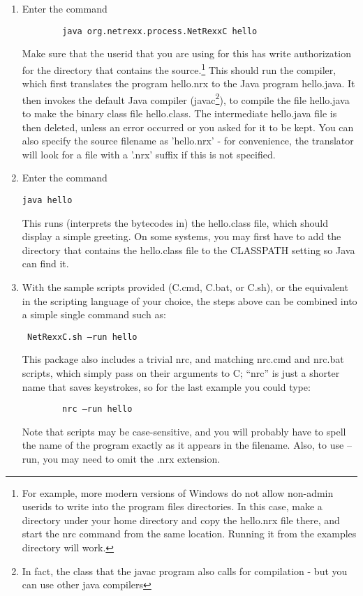 \begin{enumerate}
\item Enter the command
 \begin{verbatim}
        java org.netrexx.process.NetRexxC hello
\end{verbatim}
Make sure that the userid that you are using for this has write
authorization for the directory that contains the source.\footnote{For example,
more modern versions of Windows do not allow non-admin userids to
write into the program files directories. In this case, make a
directory under your home directory and copy the hello.nrx file there,
and start the nrc command from the same location. Running it from the
examples directory will work.}
This should run the \nr{} compiler, which first translates the
\nr{} program hello.nrx to the Java program hello.java. It then
invokes the default Java compiler (javac\footnote{In fact, the class
  that the javac program also calls for compilation - but you can use
  other java compilers}), to compile the file hello.java to make the
binary class file hello.class. The intermediate hello.java file is
then deleted, unless an error occurred or you asked for it to be
kept. You can also specify the source filename as 'hello.nrx' - for
convenience, the translator will look for a file with a '.nrx' suffix
if this is not specified.
\item Enter the command
 \begin{verbatim} 
java hello 
\end{verbatim}
This runs (interprets the bytecodes in) the hello.class file, which should display a simple greeting. On some systems, you may first have to add the directory that contains the hello.class file to the CLASSPATH setting so Java can find it. 
\item With the sample scripts provided (\nr{}C.cmd, \nr{}C.bat, or \nr{}C.sh), or the equivalent in the scripting language of your choice, the steps above can be combined into a simple single command such as:
  \begin{verbatim}
 NetRexxC.sh –run hello
\end{verbatim}
This package also includes a trivial nrc, and matching nrc.cmd and nrc.bat scripts, which simply pass on their arguments to \nr{}C; “nrc” is just a shorter name that saves keystrokes, so for the last example you could type: 
  \begin{verbatim}
        nrc –run hello
\end{verbatim}
Note that scripts may be case-sensitive, and you will probably have to spell the name of the program exactly as it appears in the filename. Also, to use –run, you may need to omit the .nrx extension. 

\end{enumerate}
